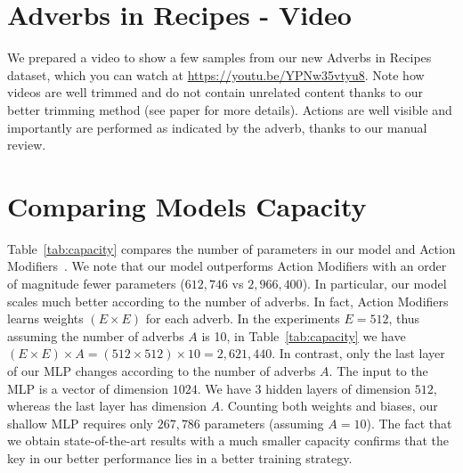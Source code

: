 \documentclass[10pt,twocolumn,letterpaper]{article}
\begin{document}
\section{Adverbs in Recipes - Video}
\label{sec:video}
We prepared a video to show a few samples from our new Adverbs in Recipes dataset, which you can watch at \href{https://youtu.be/YPNw35vtyu8}{https://youtu.be/YPNw35vtyu8}. Note how videos are well trimmed and do not contain unrelated content thanks to our better trimming method (see paper for more details). Actions are well visible and importantly are performed as indicated by the adverb, thanks to our manual review.

\begin{table}[t]
\centering
{}
\caption{Comparing number of parameters in our model and Action Modifiers~\cite{doughty2020action}, calculated for 10 adverbs. Attention parameters calculated with default settings: 4 heads, input features dimension equal to 1024 and Q, K, V dimensions equal to 512.\vspace{-10pt}}
\label{tab:capacity}
\end{table}

\vspace{-5pt}
\section{Comparing Models Capacity}
\label{sec:capacity}

Table~\ref{tab:capacity} compares the number of parameters in our model and Action Modifiers~\cite{doughty2020action}. We note that our model outperforms Action Modifiers with an order of magnitude fewer parameters ($612,746$ vs $2,966,400$). In particular, our model scales much better according to the number of adverbs. In fact, Action Modifiers learns weights $(E \times E)$ for each adverb. In the experiments $E=512$, thus assuming the number of adverbs $A$ is 10, in Table~\ref{tab:capacity} we have $(E \times E) \times A = (512 \times 512) \times 10 = 2,621,440$. In contrast, only the last layer of our MLP changes according to the number of adverbs $A$. The input to the MLP is a vector of dimension $1024$. We have 3 hidden layers of dimension $512$, whereas the last layer has dimension $A$. Counting both weights and biases, our shallow MLP requires only $267,786$ parameters (assuming $A=10$). The fact that we obtain state-of-the-art results with a much smaller capacity confirms that the key in our better performance lies in a better training strategy. 
\end{document}
